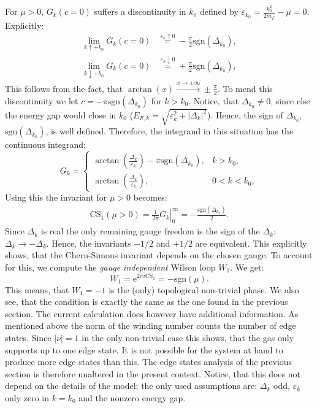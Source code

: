 For $\mu > 0$, $G_k(c = 0)$ suffers a discontinuity in $k_0$ defined by $\varepsilon_{k_0} = \frac{k_0^2}{2m_F} - \mu = 0$. Explicitly:  
\begin{align}
\lim_{k \uparrow +k_0} G_k(c = 0)   &\overset{\varepsilon_k \uparrow 0}{=}   -\frac{\pi}{2}\text{sgn}(\Delta_{k_0}), \nonumber \\
\lim_{k \downarrow +k_0} G_k(c = 0) &\overset{\varepsilon_k \downarrow 0}{=} +\frac{\pi}{2}\text{sgn}(\Delta_{k_0}), \nonumber
\end{align}
This follows from the fact, that $\arctan(x) \overset{x \to \pm \infty}{\to} \pm \frac{\pi}{2}$. To mend this discontinuity we let $ c = -\pi\text{sgn}(\Delta_{k_0})$ for $k > k_0$. Notice, that $\Delta_{k_0} \neq 0$, since else the energy gap would close in $k_0$ ($E_{F,k} = \sqrt{\varepsilon^2_k + |\Delta_k|^2}$). Hence, the sign of $\Delta_{k_0}$, $\text{sgn}(\Delta_{k_0})$, is well defined. Therefore, the integrand in this situation has the continuous integrand:
\begin{equation}
G_k = \left\{ \begin{matrix} 
\arctan\left(\frac{\Delta_k}{\varepsilon_k}\right) - \pi\text{sgn}(\Delta_{k_0}), & k > k_0, \\
\arctan\left(\frac{\Delta_k}{\varepsilon_k}\right), & 0 < k < k_0,
  \end{matrix} \right.
\label{eq.Gkmugreater0}
\end{equation}
Using this the invariant for $\mu > 0$ becomes:
\begin{align}
\text{CS}_1(\mu > 0) = \left. \frac{1}{2\pi} G_k\right|_0^{\infty} = -\frac{\text{sgn}(\Delta_{k_0})}{2}.
\label{eq.CSinv2}
\end{align}
Since $\Delta_k$ is real the only remaining gauge freedom is the sign of the $\Delta_k$: $\Delta_k \to - \Delta_k$. Hence, the invariants $-1/2$ and $+1/2$ are equivalent. This explicitly shows, that the Chern-Simons invariant depends on the chosen gauge. To account for this, we compute the \textit{gauge independent} Wilson loop $W_1$. We get: 
\begin{equation}
W_1 = \text{e}^{2\pi i \text{CS}_1} = -\text{sgn}(\mu). 
\end{equation}
This means, that $W_1 = -1$ is the (only) topological non-trivial phase. We also see, that the condition is exactly the same as the one found in the previous section. The current calculation does however have additional information. As mentioned above the norm of the winding number counts the number of edge states. Since $|\nu| = 1$ in the only non-trivial case this shows, that the gas only supports up to one edge state. It is not possible for the system at hand to produce more edge states than this. The edge states analysis of the previous section is therefore unaltered in the present context. Notice, that this does not depend on the details of the model; the only used assumptions are: $\Delta_k$ odd, $\varepsilon_k$ only zero in $k = k_0$ and the nonzero energy gap. 


